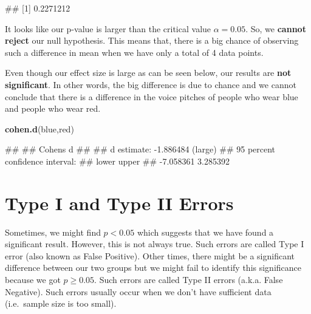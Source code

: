 \documentclass[
]{book}
\newenvironment{Shaded}{\begin{snugshade}}{\end{snugshade}}
\newcommand{\FunctionTok}[1]{\textcolor[rgb]{0.13,0.29,0.53}{\textbf{#1}}}
\newcommand{\NormalTok}[1]{#1}
\begin{document}
\begin{Shaded}
\begin{Highlighting}[]
\NormalTok{\#\# [1] 0.2271212}
\end{Highlighting}
\end{Shaded}

It looks like our p-value is larger than the critical value \(\alpha = 0.05\). So, we \textbf{cannot reject} our null hypothesis. This means that, there is a big chance of observing such a difference in mean when we have only a total of 4 data points.

Even though our effect size is large as can be seen below, our results are \textbf{not significant}. In other words, the big difference is due to chance and we cannot conclude that there is a difference in the voice pitches of people who wear blue and people who wear red.

\begin{Shaded}
\begin{Highlighting}[]
\FunctionTok{cohen.d}\NormalTok{(blue,red)}
\end{Highlighting}
\end{Shaded}

\begin{Shaded}
\begin{Highlighting}[]
\NormalTok{\#\# }
\NormalTok{\#\# Cohen\textquotesingle{}s d}
\NormalTok{\#\# }
\NormalTok{\#\# d estimate: {-}1.886484 (large)}
\NormalTok{\#\# 95 percent confidence interval:}
\NormalTok{\#\#     lower     upper }
\NormalTok{\#\# {-}7.058361  3.285392}
\end{Highlighting}
\end{Shaded}

\section{Type I and Type II Errors}\label{type-i-and-type-ii-errors}

Sometimes, we might find \(p < 0.05\) which suggests that we have found a significant result. However, this is not always true. Such errors are called Type I error (also known as False Positive). Other times, there might be a significant difference between our two groups but we might fail to identify this significance because we got \(p \geq 0.05\). Such errors are called Type II errors (a.k.a. False Negative). Such errors usually occur when we don't have sufficient data (i.e.~sample size is too small).
\end{document}
